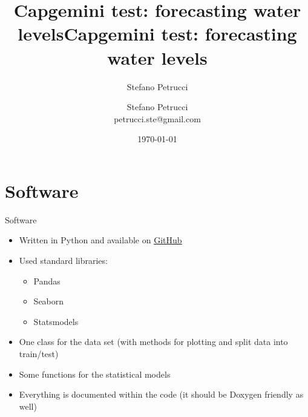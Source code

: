 \documentclass[aspectratio=169, glossy]{beamer}
\title{Capgemini test: forecasting water levels}
\author{Stefano Petrucci}
\institute{}
\date{\today}
\begin{document}

\begin{frame}[plain]
\title{\LARGE{\textcolor{MyBlue}{Capgemini test: forecasting water levels}}}
\author{
	Stefano Petrucci\\
	\footnotesize{petrucci.ste@gmail.com}
}
\date{}
\titlepage
\end{frame}


\begin{frame}
  \tableofcontents
\end{frame}

\section{Software}

\begin{frame}{Software}
  \begin{itemize}
    \item Written in Python and available on \href{https://github.com/petruccs/water_test}{\underline{GitHub}}
    \item Used standard libraries:
    \begin{itemize}
      \item Pandas
      \item Seaborn
      \item Statsmodels
    \end{itemize}
    \item One class for the data set (with methods for plotting and split data into train/test)
    \item Some functions for the statistical models
    \item Everything is documented within the code (it should be Doxygen friendly as well)
  \end{itemize}
\end{frame}
\end{document}
